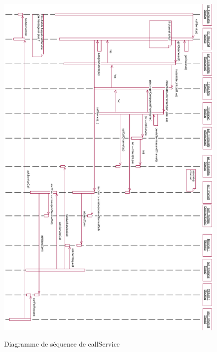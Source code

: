 \begin{figure}
    \begin{center}
        \includegraphics[scale=0.65]{images/seq1.png}
        \label{annexe:callServiceSeq}
        \caption{Diagramme de séquence de callService}
    \end{center}
\end{figure} 
